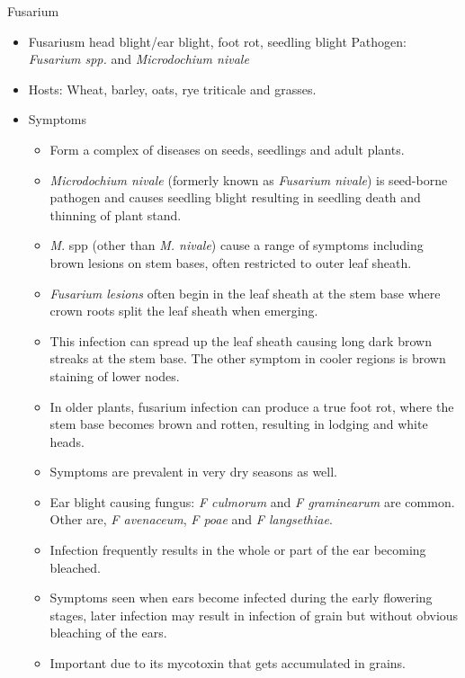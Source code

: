 \documentclass[10pt,dvipsnames,ignorenonframetext,aspectratio=169]{beamer}
\providecommand{\tightlist}{%
  \setlength{\itemsep}{0pt}\setlength{\parskip}{0pt}}
\begin{document}
\begin{frame}{Fusarium}
\protect\hypertarget{fusarium}{}
\begin{itemize}
\tightlist
\item
  Fusariusm head blight/ear blight, foot rot, seedling blight Pathogen:
  \emph{Fusarium spp.} and \emph{Microdochium nivale}
\item
  Hosts: Wheat, barley, oats, rye triticale and grasses.
\item
  Symptoms

  \begin{itemize}
  \scriptsize
  \item Form a complex of diseases on seeds, seedlings and adult plants.
  \item \textit{Microdochium nivale} (formerly known as \textit{Fusarium nivale}) is seed-borne pathogen and causes seedling blight resulting in seedling death and thinning of plant stand.
  \item \textit{M}. spp (other than \textit{M. nivale}) cause a range of symptoms including brown lesions on stem bases, often restricted to outer leaf sheath.
  \item \textit{Fusarium lesions} often begin in the leaf sheath at the stem base where crown roots split the leaf sheath when emerging.
  \item This infection can spread up the leaf sheath causing long dark brown streaks at the stem base. The other symptom in cooler regions is brown staining of lower nodes.
  \item In older plants, fusarium infection can produce a true foot rot, where the stem base becomes brown and rotten, resulting in lodging and white heads.
  \item Symptoms are prevalent in very dry seasons as well.
  \item Ear blight causing fungus: \textit{F culmorum} and \textit{F graminearum} are common. Other are, \textit{F avenaceum}, \textit{F poae} and \textit{F langsethiae}.
  \item Infection frequently results in the whole or part of the ear becoming bleached.
  \item Symptoms seen when ears become infected during the early flowering stages, later infection may result in infection of grain but without obvious bleaching of the ears.
  \item Important due to its mycotoxin that gets accumulated in grains.
  \end{itemize}
\end{itemize}
\end{frame}
\end{document}
